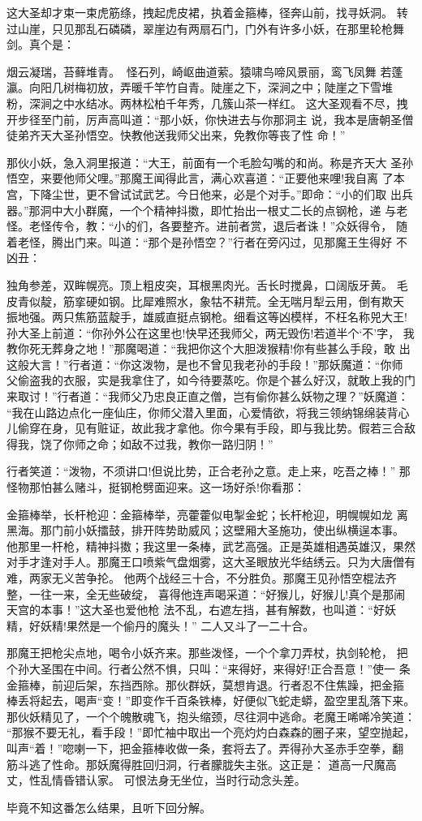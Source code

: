 这大圣却才束一束虎筋绦，拽起虎皮裙，执着金箍棒，径奔山前，找寻妖洞。
转过山崖，只见那乱石磷磷，翠崖边有两扇石门，门外有许多小妖，在那里轮枪舞
剑。真个是：

烟云凝瑞，苔藓堆青。怪石列，崎岖曲道萦。猿啸鸟啼风景丽，鸾飞凤舞
若蓬瀛。向阳几树梅初放，弄暖千竿竹自青。陡崖之下，深涧之中；陡崖之下雪堆
粉，深涧之中水结冰。两林松柏千年秀，几簇山茶一样红。
这大圣观看不尽，拽开步径至门前，厉声高叫道：“那小妖，你快进去与你那洞主
说，我本是唐朝圣僧徒弟齐天大圣孙悟空。快教他送我师父出来，免教你等丧了性
命！”

那伙小妖，急入洞里报道：“大王，前面有一个毛脸勾嘴的和尚。称是齐天大
圣孙悟空，来要他师父哩。”那魔王闻得此言，满心欢喜道：“正要他来哩!我自离
了本宫，下降尘世，更不曾试试武艺。今日他来，必是个对手。”即命：“小的们取
出兵器。”那洞中大小群魔，一个个精神抖擞，即忙抬出一根丈二长的点钢枪，递
与老怪。老怪传令，教：“小的们，各要整齐。进前者赏，退后者诛！”众妖得令，
随着老怪，腾出门来。叫道：“那个是孙悟空？”行者在旁闪过，见那魔王生得好
不凶丑：

独角参差，双眸幌亮。顶上粗皮突，耳根黑肉光。舌长时搅鼻，口阔版牙黄。
毛皮青似靛，筋挛硬如钢。比犀难照水，象牯不耕荒。全无喘月犁云用，倒有欺天
振地强。两只焦筋蓝靛手，雄威直挺点钢枪。细看这等凶模样，不枉名称兕大王!
孙大圣上前道：“你孙外公在这里也!快早还我师父，两无毁伤!若道半个‘不’字，
我教你死无葬身之地！”那魔喝道：“我把你这个大胆泼猴精!你有些甚么手段，敢
出这般大言！”行者道：“你这泼物，是也不曾见我老孙的手段！”那妖魔道：“你师
父偷盗我的衣服，实是我拿住了，如今待要蒸吃。你是个甚么好汉，就敢上我的门
来取讨！”行者道：“我师父乃忠良正直之僧，岂有偷你甚么妖物之理？”妖魔道：
“我在山路边点化一座仙庄，你师父潜入里面，心爱情欲，将我三领纳锦绵装背心
儿偷穿在身，见有赃证，故此我才拿他。你今果有手段，即与我比势。假若三合敌
得我，饶了你师之命；如敌不过我，教你一路归阴！”

行者笑道：“泼物，不须讲口!但说比势，正合老孙之意。走上来，吃吾之棒！”
那怪物那怕甚么赌斗，挺钢枪劈面迎来。这一场好杀!你看那：

金箍棒举，长杆枪迎：金箍棒举，亮藿藿似电掣金蛇；长杆枪迎，明幌幌如龙
离黑海。那门前小妖擂鼓，排开阵势助威风；这壁厢大圣施功，使出纵横逞本事。
他那里一杆枪，精神抖擞；我这里一条棒，武艺高强。正是英雄相遇英雄汉，果然
对手才逢对手人。那魔王口喷紫气盘烟雾，这大圣眼放光华结绣云。只为大唐僧有
难，两家无义苦争抡。
他两个战经三十合，不分胜负。那魔王见孙悟空棍法齐整，一往一来，全无些破绽，
喜得他连声喝采道：“好猴儿，好猴儿!真个是那闹天宫的本事！”这大圣也爱他枪
法不乱，右遮左挡，甚有解数，也叫道：“好妖精，好妖精!果然是一个偷丹的魔头！”
二人又斗了一二十合。

那魔王把枪尖点地，喝令小妖齐来。那些泼怪，一个个拿刀弄杖，执剑轮枪，
把个孙大圣围在中间。行者公然不惧，只叫：“来得好，来得好!正合吾意！”使一
条金箍棒，前迎后架，东挡西除。那伙群妖，莫想肯退。行者忍不住焦躁，把金箍
棒丢将起去，喝声“变！”即变作千百条铁棒，好便似飞蛇走蟒，盈空里乱落下来。
那伙妖精见了，一个个魄散魂飞，抱头缩颈，尽往洞中逃命。老魔王唏唏冷笑道：
“那猴不要无礼，看手段！”即忙袖中取出一个亮灼灼白森森的圈子来，望空抛起，
叫声“着！”唿喇一下，把金箍棒收做一条，套将去了。弄得孙大圣赤手空拳，翻
筋斗逃了性命。那妖魔得胜回归洞，行者朦胧失主张。这正是：
道高一尺魔高丈，性乱情昏错认家。
可恨法身无坐位，当时行动念头差。

毕竟不知这番怎么结果，且听下回分解。